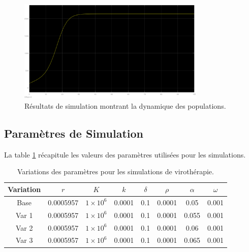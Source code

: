 \documentclass{article}
\begin{document}
\begin{figure}[H]
\centering
\includegraphics[width=0.8\textwidth]{src/simulation_result.png}
\caption{Résultats de simulation montrant la dynamique des populations.}
\label{fig:simresult}
\end{figure}

\subsection{Paramètres de Simulation}
La table \ref{tab:parameters} récapitule les valeurs des paramètres utilisées pour les simulations.

\begin{table}[h]
    \centering
    \begin{tabular}{@{}cccccccc@{}}
    \toprule
    Variation & \( r \) & \( K \) & \( k \) & \( \delta \) & \( \rho \) & \( \alpha \) & \( \omega \) \\ \midrule
    Base      & 0.0005957 & \( 1 \times 10^6 \) & 0.0001 & 0.1 & 0.0001 & 0.05  & 0.001 \\
    Var 1     & 0.0005957 & \( 1 \times 10^6 \) & 0.0001 & 0.1 & 0.0001 & 0.055 & 0.001 \\
    Var 2     & 0.0005957 & \( 1 \times 10^6 \) & 0.0001 & 0.1 & 0.0001 & 0.06  & 0.001 \\
    Var 3     & 0.0005957 & \( 1 \times 10^6 \) & 0.0001 & 0.1 & 0.0001 & 0.065 & 0.001 \\
    \bottomrule
    \end{tabular}
    \caption{Variations des paramètres pour les simulations de virothérapie.}
    \label{tab:parameters}
    \end{table}



\end{document}
